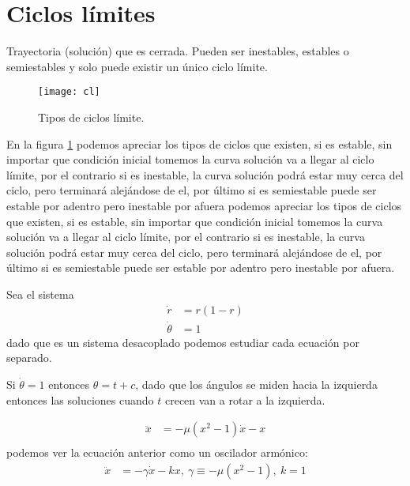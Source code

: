 \section{Ciclos límites}

\begin{tcolorbox}[colback=Black!4, colframe=White, arc=2mm]
\begin{definicion}
  Trayectoria (solución) que es cerrada. Pueden ser inestables, estables o semiestables y solo puede existir un único ciclo límite.
  
\end{definicion}
\end{tcolorbox}

\begin{figure}[htpb]
  \centering
  \texttt{[image: cl]}
  \caption{Tipos de ciclos límite.}
  \label{tiposCiclos}
\end{figure}
En la figura \ref{tiposCiclos} podemos apreciar los tipos de ciclos que existen, si es estable, sin importar que condición inicial tomemos la curva solución va a llegar al ciclo límite, por el contrario si es inestable, la curva solución podrá estar muy cerca del ciclo, pero terminará alejándose de el, por último si es semiestable puede ser estable por adentro pero inestable por afuera podemos apreciar los tipos de ciclos que existen, si es estable, sin importar que condición inicial tomemos la curva solución va a llegar al ciclo límite, por el contrario si es inestable, la curva solución podrá estar muy cerca del ciclo, pero terminará alejándose de el, por último si es semiestable puede ser estable por adentro pero inestable por afuera.

\begin{ejemplo} Sea el sistema $$
\begin{aligned}
  \dot{r} &= r(1-r) \\ 
  \dot{\theta}&=1
\end{aligned}
$$
dado que es un sistema desacoplado podemos estudiar cada ecuación por separado. 

Si $\dot{\theta}=1$ entonces $\theta=t+c$, dado que los ángulos se miden hacia la izquierda entonces las soluciones cuando $t$ crecen van a rotar a la izquierda.
\end{ejemplo}

\begin{ejemplo}
  $$
  \begin{aligned}
    \ddot{x} &= -\mu(x^2-1)\dot{x}-x \\  
  \end{aligned}
  $$
  podemos ver la ecuación anterior como un oscilador armónico: $$
  \begin{aligned}
    \ddot{x} &= -\gamma \dot{x}-kx,\ \gamma \equiv -\mu(x^2-1),\ k=1 \\   
  \end{aligned}
  $$
\end{ejemplo}

